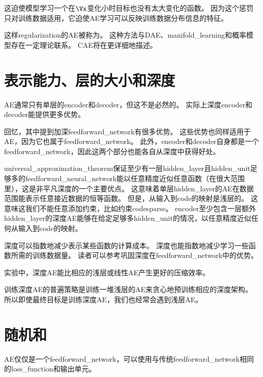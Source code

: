 这迫使模型学习一个在$\Vx$变化小时目标也没有太大变化的函数。
因为这个惩罚只对训练数据适用，它迫使\gls{AE}学习可以反映训练数据分布信息的特征。


这样\gls{regularization}的\gls{AE}被称为。
这种方法与\gls{DAE}、\gls{manifold_learning}和概率模型存在一定理论联系。
\gls{CAE}将在更详细地描述。


\section{表示能力、层的大小和深度}
\label{sec:representational_power_layer_size_and_depth}
\gls{AE}通常只有单层的\gls{encoder}和\gls{decoder}，但这不是必然的。
实际上深度\gls{encoder}和\gls{decoder}能提供更多优势。


回忆，其中提到加深\gls{feedforward_network}有很多优势。
这些优势也同样适用于\gls{AE}，因为它也属于\gls{feedforward_network}。
此外，\gls{encoder}和\gls{decoder}自身都是一个\gls{feedforward_network}，因此这两个部分也能各自从深度中获得好处。


\gls{universal_approximation_theorem}保证至少有一层\gls{hidden_layer}且\gls{hidden_unit}足够多的\gls{feedforward_neural_network}能以任意精度近似任意函数（在很大范围里），这是非平凡深度的一个主要优点。
这意味着单层\gls{hidden_layer}的\gls{AE}在数据范围能表示任意接近数据的恒等函数。
但是，从输入到\gls{code}的映射是浅层的。
这意味这我们不能任意添加约束，比如约束\gls{code}\gls{sparse}。
\gls{encoder}至少包含一层额外\gls{hidden_layer}的深度\gls{AE}能够在给定足够多\gls{hidden_unit}的情况，以任意精度近似任何从输入到\gls{code}的映射。


深度可以指数地减少表示某些函数的计算成本。
深度也能指数地减少学习一些函数所需的训练数据量。
读者可以参考巩固深度在\gls{feedforward_network}中的优势。


实验中，深度\gls{AE}能比相应的浅层或线性\gls{AE}产生更好的压缩效率\citep{Hinton-Science2006}。

训练深度\gls{AE}的普遍策略是训练一堆浅层的\gls{AE}来贪心地预训练相应的深度架构。
所以即使最终目标是训练深度\gls{AE}，我们也经常会遇到浅层\gls{AE}。


\section{随机和}
\label{sec:stochastic_encoders_and_decoders}
\gls{AE}仅仅是一个\gls{feedforward_network}，可以使用与传统\gls{feedforward_network}相同的\gls{loss_function}和输出单元。


